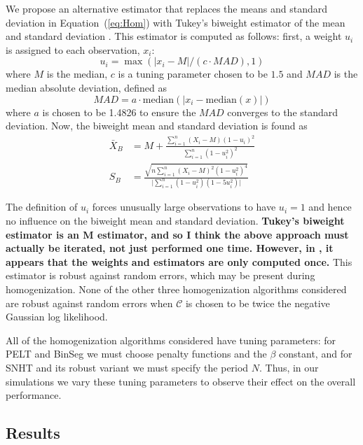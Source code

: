 \documentclass[12pt]{article}
\begin{document}
\begin{doublespacing}
We propose an alternative estimator that replaces the means and standard deviation in Equation~(\ref{eq:Hom}) with Tukey's biweight estimator of the mean and standard deviation \cite{hoaglin83}.  This estimator is computed as follows: first, a weight $u_i$ is assigned to each observation, $x_i$:
\begin{equation*}
	u_i = \max\left(\lvert x_i-M \rvert/(c \cdot MAD), 1 \right)
\end{equation*}
where $M$ is the median, $c$ is a tuning parameter chosen to be $1.5$ and $MAD$ is the median absolute deviation, defined as
\begin{equation*}
	MAD = a \cdot \mbox{median}( \lvert x_i - \mbox{median}(x) \rvert )
\end{equation*}
where $a$ is chosen to be 1.4826 to ensure the $MAD$ converges to the standard deviation.  Now, the biweight mean and standard deviation is found as
\begin{align*}
	\bar{X}_B &= M + \frac{\sum_{i=1}^n (X_i-M)(1-u_i)^2}{\sum_{i=1}^n (1-u_i^2)^2}\\
	S_B &= \frac{\sqrt{n \sum_{i=1}^n (X_i-M)^2(1-u_i^2)^4}}{\lvert \sum_{i=1}^n (1-u_i^2)(1-5 u_i^2)\rvert}
\end{align*}

The definition of $u_i$ forces unusually large observations to have $u_i=1$ and hence no influence on the biweight mean and standard deviation.  \textbf{Tukey's biweight estimator is an M estimator, and so I think the above approach must actually be iterated, not just performed one time.  However, in \cite{lanzante96}, it appears that the weights and estimators are only computed once.} This estimator is robust against random errors, which may be present during homogenization.  None of the other three homogenization algorithms considered are robust against random errors when $\mathcal{C}$ is chosen to be twice the negative Gaussian log likelihood.

All of the homogenization algorithms considered have tuning parameters: for PELT and BinSeg we must choose penalty functions and the $\beta$ constant, and for SNHT and its robust variant we must specify the period $N$.  Thus, in our simulations we vary these tuning parameters to observe their effect on the overall performance.

\subsection{Results}

\label{sec:HomResults}








\end{doublespacing}
\end{document}
